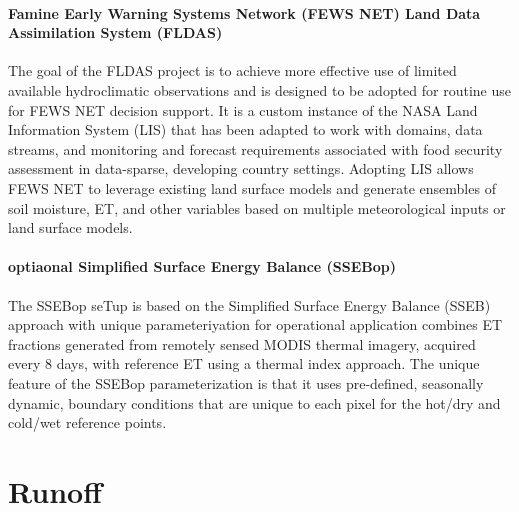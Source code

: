 \paragraph{Famine Early Warning Systems Network (FEWS NET) Land Data Assimilation System (FLDAS)}
The goal of the FLDAS project is to achieve more effective use of limited available hydroclimatic observations and is designed to be adopted for routine use for FEWS NET decision support. It is a custom instance of the NASA Land Information System (LIS) that has been adapted to work with domains, data streams, and monitoring and forecast requirements associated with food security assessment in data-sparse, developing country settings. Adopting LIS allows FEWS NET to leverage existing land surface models and generate ensembles of soil moisture, ET, and other variables based on multiple meteorological inputs or land surface models.
\paragraph{optiaonal Simplified Surface Energy Balance (SSEBop)}
The SSEBop seTup is based on the Simplified Surface Energy Balance (SSEB) approach with unique parameteriyation for operational application combines ET fractions generated from remotely sensed MODIS thermal imagery, acquired every 8 days, with reference ET using a thermal index approach. The unique feature of the SSEBop parameterization is that it uses pre-defined, seasonally dynamic, boundary conditions that are unique to each pixel for the hot/dry and cold/wet reference points.
\section{Runoff}\label{sec:runoff}

